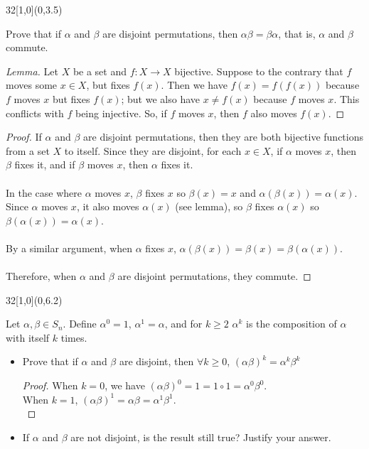 \documentclass[12pt]{article}
\newenvironment{exercise}[2]{\begin{textblock}{32}[1,0](0,#2)\noindent#1\end{textblock}}{\vspace{1in}}
\begin{document}
\begin{exercise}{1.8}{3.5}
	{\noindent}Prove that if $\alpha$ and $\beta$ are disjoint permutations, then $\alpha\beta=\beta\alpha$, that is, $\alpha$ and $\beta$ commute.
	\bigskip

	\begin{proof}[Lemma]
		Let $X$ be a set and $f:X\to X$ bijective. Suppose to the contrary that $f$ moves some $x\in X$, but fixes $f(x)$. Then we have $f(x) = f(f(x))$ because $f$ moves $x$ but fixes $f(x)$; but we also have $x\neq f(x)$ because $f$ moves $x$. This conflicts with $f$ being injective.
		So, if $f$ moves $x$, then $f$ also moves $f(x)$.
	\end{proof}
	\bigskip

	\begin{proof}
		If $\alpha$ and $\beta$ are disjoint permutations, then they are both bijective functions from a set $X$ to itself. Since they are disjoint, for each $x\in X$, if $\alpha$ moves $x$, then $\beta$ fixes it, and if $\beta$ moves $x$, then $\alpha$ fixes it.\\
		\\
		In the case where $\alpha$ moves $x$, $\beta$ fixes $x$ so $\beta(x) = x$ and $\alpha(\beta(x)) = \alpha(x)$.\\
		Since $\alpha$ moves $x$, it also moves $\alpha(x)$ (see lemma), so $\beta$ fixes $\alpha(x)$ so $\beta(\alpha(x)) = \alpha(x)$.\\
		\\
		By a similar argument, when $\alpha$ fixes $x$, $\alpha(\beta(x)) = \beta(x) = \beta(\alpha(x))$.\\
		\\
		Therefore, when $\alpha$ and $\beta$ are disjoint permutations, they commute.
	\end{proof}
\end{exercise}


\begin{exercise}{1.10}{6.2}
  {\noindent}Let $\alpha, \beta\in S_n$. Define $\alpha^0=1$, $\alpha^1=\alpha$, and for $k\ge 2$ $\alpha^k$ is the composition of $\alpha$ with itself $k$ times.
  \begin{itemize}
    \item Prove that if $\alpha$ and $\beta$ are disjoint, then $\forall k\ge0$, $(\alpha\beta)^k=\alpha^k\beta^k$
    \bigskip

  	\begin{proof}
			When $k=0$, we have $(\alpha\beta)^0 = 1 = 1\circ 1 = \alpha^0\beta^0$.\\
			When $k=1$, $(\alpha\beta)^1 = \alpha\beta = \alpha^1\beta^1$.\\
			

  	\end{proof}
  	\vspace{1in}

    \item If $\alpha$ and $\beta$ are not disjoint, is the result still true? Justify your answer.
	  \bigskip
  \end{itemize}
\end{exercise}
\end{document}
